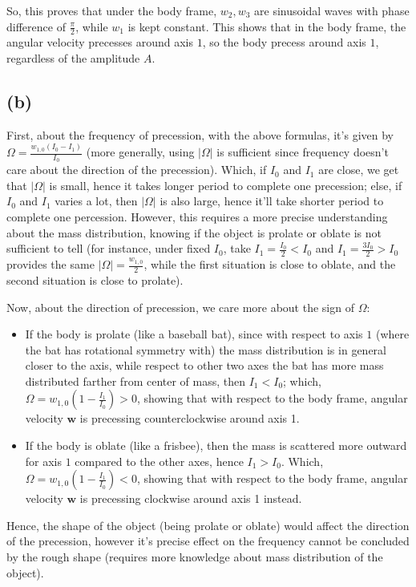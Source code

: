 \documentclass{article}
\newcommand{\bw}{\textbf{w}} %
\begin{document}
So, this proves that under the body frame, $w_2,w_3$ are sinusoidal waves with phase difference of $\frac{\pi}{2}$, while $w_1$ is kept constant. This shows that in the body frame, the angular velocity precesses around axis $1$, so the body precess around axis $1$, regardless of the amplitude $A$.

\subsection*{(b)}
First, about the frequency of precession, with the above formulas, it's given by $\Omega = \frac{w_{1,0}(I_0-I_1)}{I_0}$ (more generally, using $|\Omega|$ is sufficient since frequency doesn't care about the direction of the precession). 
Which, if $I_0$ and $I_1$ are close, we get that $|\Omega|$ is small, hence it takes longer period to complete one precession; else, if $I_0$ and $I_1$ varies a lot, then $|\Omega|$ is also large, hence it'll take shorter period to complete one percession. However, this requires a more precise understanding about the mass distribution, knowing if the object is prolate or oblate is not sufficient to tell (for instance, under fixed $I_0$, take $I_1 = \frac{I_0}{2}<I_0$ and $I_1 = \frac{3I_0}{2}>I_0$ provides the same $|\Omega|=\frac{w_{1,0}}{2}$, while the first situation is close to oblate, and the second situation is close to prolate).

\hfil

Now, about the direction of precession, we care more about the sign of $\Omega$:
\begin{itemize}
    \item If the body is prolate (like a baseball bat), since with respect to axis $1$ (where the bat has rotational symmetry with) the mass distribution is in general closer to the axis, while respect to other two axes the bat has more mass distributed farther from center of mass, then $I_1 < I_0$; which, $\Omega =w_{1,0}(1-\frac{I_1}{I_0})>0$, showing that with respect to the body frame, angular velocity $\bw$ is precessing counterclockwise around axis 1.
    \item If the body is oblate (like a frisbee), then the mass is scattered more outward for axis $1$ compared to the other axes, hence $I_1>I_0$. Which, $\Omega=w_{1,0}(1-\frac{I_1}{I_0})<0$, showing that with respect to the body frame, angular velocity $\bw$ is precessing clockwise around axis 1 instead.
\end{itemize}
Hence, the shape of the object (being prolate or oblate) would affect the direction of the precession, however it's precise effect on the frequency cannot be concluded by the rough shape (requires more knowledge about mass distribution of the object).
\end{document}

